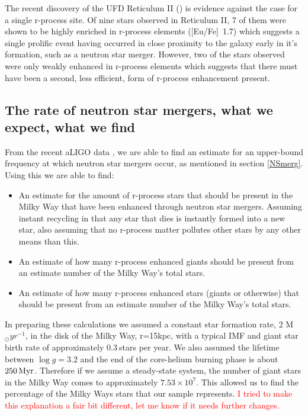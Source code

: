 \documentclass[a4paper,fleqn,usenatbib]{mnras}
\newcommand{\todo}[1]{\textcolor{red}{#1}}
\begin{document}
	The recent discovery of the UFD Reticulum II (\cite{Ji2016}) is evidence against the case for a single r-process site. Of nine stars observed in Reticulum II, 7 of them were shown to be highly enriched in r-process elements ([Eu/Fe]~1.7) which suggests a single prolific event having occurred in close proximity to the galaxy early in it's formation, such as a neutron star merger. However, two of the stars observed were only weakly enhanced in r-process elements which suggests that there must have been a second, less efficient, form of r-process enhancement present.
	
	\subsection{The rate of neutron star mergers, what we expect, what we find}
	From the recent aLIGO data \cite{LIGO2016}, we are able to find an estimate for an upper-bound frequency at which neutron star mergers occur, as mentioned in section \ref{NSmerg}. 
	Using this we are able to find:
	\begin{itemize}
		\item An estimate for the amount of r-process stars that should be present in the Milky Way that have been enhanced through neutron star mergers. Assuming instant recycling in that any star that dies is instantly formed into a new star, also assuming that no r-process matter pollutes other stars by any other means than this. 
		\item An estimate of how many r-process enhanced giants should be present from an estimate number of the Milky Way's total stars.
		\item An estimate of how many r-process enhanced stars (giants or otherwise) that should be present from an estimate number of the Milky Way's total stars.
	\end{itemize}
	
	In preparing these calculations we assumed a constant star formation rate, 2 M$_\odot yr^{-1}$, in the disk of the Milky Way, r=15kpc, with a typical IMF and giant star birth rate of approximately $0.3\ $stars per year. We also assumed the lifetime between $\log{g} = 3.2$ and the end of the core-helium burning phase is about $250\,{\rm Myr}$. Therefore if we assume a steady-state system, the number of giant stars in the Milky Way comes to approximately $7.53\times10^7$. This allowed us to find the percentage of the Milky Ways stars that our sample represents. \todo{I tried to make this explanation a fair bit different, let me know if it needs further changes.}
	
\end{document}
